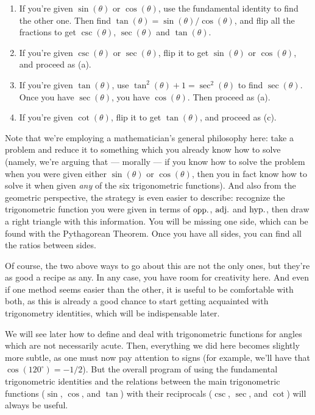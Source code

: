 \documentclass{ximera}
\begin{document}
\begin{enumerate}
\item If you're given $\sin(\theta)$ or $\cos(\theta)$, use the fundamental identity to find the other one. Then find $\tan(\theta)=\sin(\theta)/\cos(\theta)$, and flip all the fractions to get $\csc(\theta)$, $\sec(\theta)$ and $\tan(\theta)$.
\item If you're given $\csc(\theta)$ or $\sec(\theta)$, flip it to get $\sin(\theta)$ or $\cos(\theta)$, and proceed as (a).
\item If you're given $\tan(\theta)$, use $\tan^2(\theta)+1=\sec^2(\theta)$ to find $\sec(\theta)$. Once you have $\sec(\theta)$, you have $\cos(\theta)$. Then proceed as (a).
\item If you're given $\cot(\theta)$, flip it to get $\tan(\theta)$, and proceed as (c).
\end{enumerate}

Note that we're employing a mathematician's general philosophy here: take a problem and reduce it to something which you already know how to solve (namely, we're arguing that --- morally --- if you know how to solve the problem when you were given either $\sin(\theta)$ or $\cos(\theta)$, then you in fact know how to solve it when given \emph{any} of the six trigonometric functions). And also from the geometric perspective, the strategy is even easier to describe: recognize the trigonometric function you were given in terms of ${\rm opp.}$, ${\rm adj.}$ and ${\rm hyp.}$, then draw a right triangle with this information. You will be missing one side, which can be found with the Pythagorean Theorem. Once you have all sides, you can find all the ratios between sides.

Of course, the two above ways to go about this are not the only ones, but they're as good a recipe as any. In any case, you have room for creativity here. And even if one method seems easier than the other, it is useful to be comfortable with both, as this is already a good chance to start getting acquainted with trigonometry identities, which will be indispensable later.

We will see later how to define and deal with trigonometric functions for angles which are not necessarily acute. Then, everything we did here becomes slightly more subtle, as one must now pay attention to signs (for example, we'll have that $\cos(120^\circ) = -1/2$). But the overall program of using the fundamental trigonometric identities and the relations between the main trigonometric functions ($\sin$, $\cos$, and $\tan$) with their reciprocals ($\csc$, $\sec$, and $\cot$) will always be useful.
\end{document}

